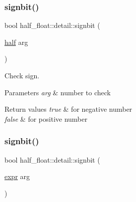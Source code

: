 \subsubsection{\texorpdfstring{signbit()}{signbit()}\hspace{0.1cm}{\footnotesize\ttfamily [1/2]}}
{\footnotesize\ttfamily bool half\+\_\+float\+::detail\+::signbit (\begin{DoxyParamCaption}\item[{\hyperlink{classhalf__float_1_1half}{half}}]{arg }\end{DoxyParamCaption})\hspace{0.3cm}{\ttfamily [inline]}}

Check sign. 
\begin{DoxyParams}{Parameters}
{\em arg} & number to check \\
\hline
\end{DoxyParams}

\begin{DoxyRetVals}{Return values}
{\em true} & for negative number \\
\hline
{\em false} & for positive number \\
\hline
\end{DoxyRetVals}
\mbox{\label{namespacehalf__float_1_1detail_ac957d466a743fdc5910216506256ea3c}} 
\subsubsection{\texorpdfstring{signbit()}{signbit()}\hspace{0.1cm}{\footnotesize\ttfamily [2/2]}}
{\footnotesize\ttfamily bool half\+\_\+float\+::detail\+::signbit (\begin{DoxyParamCaption}\item[{\hyperlink{structhalf__float_1_1detail_1_1expr}{expr}}]{arg }\end{DoxyParamCaption})\hspace{0.3cm}{\ttfamily [inline]}}

\mbox{\label{namespacehalf__float_1_1detail_a3c1cc34288f381ee6543c05034783c93}} 
